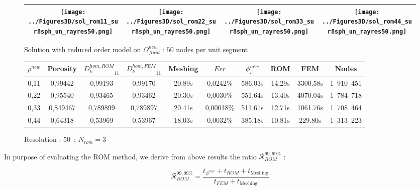 {\begin{figure}[H]%
%
\begin{center}
\begin{tabular}{|c|c|c|c|}
\hline
\texttt{[image: ../Figures3D/sol\_rom11\_sur8sph\_un\_rayres50.png]}%
&%
\texttt{[image: ../Figures3D/sol\_rom22\_sur8sph\_un\_rayres50.png]}%
&%
\texttt{[image: ../Figures3D/sol\_rom33\_sur8sph\_un\_rayres50.png]}%
&%
\texttt{[image: ../Figures3D/sol\_rom44\_sur8sph\_un\_rayres50.png]}%
\\
\hline
\end{tabular}
\end{center}
%
\caption{Solution with reduced order model on $\Omega_{fluid}^{new}$ : $50$ nodes per unit segment}
\end{figure}

\begin{figure}[H]%
%
\begin{center}
\begin{tabular}{|c|c||c|c||c|c||c|c||c||c|}
\hline
\rowcolor{lightgray} $\rho^{new}$&Porosity&${D_k^{hom,ROM}}_{11}$&${D_k^{hom,FEM}}_{11}$&Meshing&$Err$&$\phi_i^{new}$&ROM&FEM&Nodes\\
\hline
\rowcolor{yellow} 0,11&0,99442&0,99193&0,99170&20.89s&0,0242\%&586.03s&14.29s&3300.58s&1\ 910\ 451\\
\hline
\rowcolor{yellow} 0,22&0,95540&0,93465&0,93462&20.30s&0,0030\%&551.64s&13.40s&4070.04s&1\ 784\ 718\\
\hline
\rowcolor{yellow} 0,33&0,849467&0,789899&0,789897&20.41s&0,00018\%&511.61s&12.71s&1061.76s&1\ 708\ 464\\
\hline
0,44&0,64318&0,53969&0,53967&18.03s&0,0032\%&385.18s&10.81s&229.80s&1\ 313\ 223\\
\hline
\end{tabular}
\end{center}
\caption{Resolution : $50$\ ; $N_{rom}=3$}
%
\end{figure}

\ligneinter
In purpose of evaluating the ROM method, we derive from above results the ratio $\mathcal{R}_{ROM}^{99,99\%}$ :

\begin{equation}
\label{eval_rom}
\mathcal{R}_{ROM}^{99,99\%}=\dfrac{t_{\phi^{new}}+t_{ROM}+t_{\text{Meshing}}}{t_{FEM}+t_{\text{Meshing}}}
\end{equation}

}
